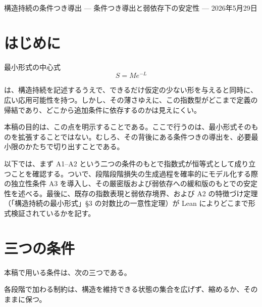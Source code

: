\documentclass[12pt,a4paper]{article}
\begin{document}
\PaperTitleBlock
  {構造持続の条件つき導出}
  {— 条件つき導出と弱依存下の安定性 —}
  {2026年5月29日}

\begin{abstract}
構造持続の最小形式では、構造持続量を \(S = Me^{-L}\) と表す。その背後には、状態集合の残存量に関する指数式 \(m(V_n) = m(V_0) e^{-L}\) がある。この式は、状態集合の縮小率を対数比で定義する限り恒等式として成り立ち、段階損失どうしの独立性を要しない。本稿の目的は、この恒等式を繰り返すことではなく、どこまでが定義の帰結であり、どこからが追加条件に依存するのかを明示することにある。

そのために、まず A1--A2 のもとで恒等式が成り立つことを確認する。ついで、段階段階損失の生成過程を確率的にモデル化する際の独立性条件 A3 を導入し、その緩和のもとでどこまで安定性が保たれるかを述べる。最後に、Lean による形式検証の範囲を記す。本稿の役割は、最小形式の背後にある数学的骨格を、必要最小限のかたちで与えることにある。
\end{abstract}

\section{はじめに}\label{ux306fux3058ux3081ux306b}

最小形式の中心式 \[
S = Me^{-L}
\]

は、構造持続を記述するうえで、できるだけ仮定の少ない形を与えると同時に、広い応用可能性を持つ。しかし、その薄さゆえに、この指数型がどこまで定義の帰結であり、どこから追加条件に依存するのかは見えにくい。

本稿の目的は、この点を明示することである。ここで行うのは、最小形式そのものを拡張することではない。むしろ、その背後にある条件つきの導出を、必要最小限のかたちで切り出すことである。

以下では、まず A1--A2 という二つの条件のもとで指数式が恒等式として成り立つことを確認する。ついで、段階段階損失の生成過程を確率的にモデル化する際の独立性条件 A3 を導入し、その厳密版および弱依存への緩和版のもとでの安定性を述べる。最後に、既存の指数表現と弱依存境界、および A2 の特徴づけ定理（「構造持続の最小形式」§3 の対数比の一意性定理）が Lean によりどこまで形式検証されているかを記す。

\section{三つの条件}\label{ux4e09ux3064ux306eux6761ux4ef6}

本稿で用いる条件は、次の三つである。

\begin{assumption}[A1]
各段階で加わる制約は、構造を維持できる状態の集合を広げず、縮めるか、そのままに保つ。
\end{assumption}
\end{document}
